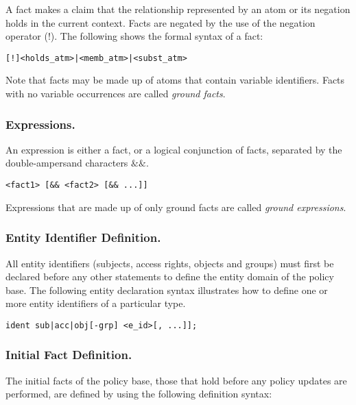 \documentclass[11pt]{llncs}
\begin{document}
        A fact makes a claim that the relationship represented by an atom or
        its negation holds in the current context. Facts are negated by the
        use of the negation operator ($!$). The following shows the formal
        syntax of a fact:

        \begin{verbatim}[!]<holds_atm>|<memb_atm>|<subst_atm>\end{verbatim}

        Note that facts may be made up of atoms that contain variable
        identifiers. Facts with no variable occurrences are called {\em ground
        facts}.

      \subsubsection{Expressions.}

        An expression is either a fact, or a logical conjunction of facts,
        separated by the double-ampersand characters $\&\&$.

        \begin{verbatim}<fact1> [&& <fact2> [&& ...]]\end{verbatim}

        Expressions that are made up of only ground facts are called
        {\em ground expressions}.

      \subsubsection{Entity Identifier Definition.}

        All entity identifiers (subjects, access rights, objects and groups)
        must first be declared before any other statements to define the
        entity domain of the policy base. The following entity declaration
        syntax illustrates how to define one or more entity identifiers of a
        particular type.

        \begin{verbatim}ident sub|acc|obj[-grp] <e_id>[, ...]];\end{verbatim}

      \subsubsection{Initial Fact Definition.}

        The initial facts of the policy base, those that hold before any
        policy updates are performed, are defined by using the following
        definition syntax:
\end{document}
